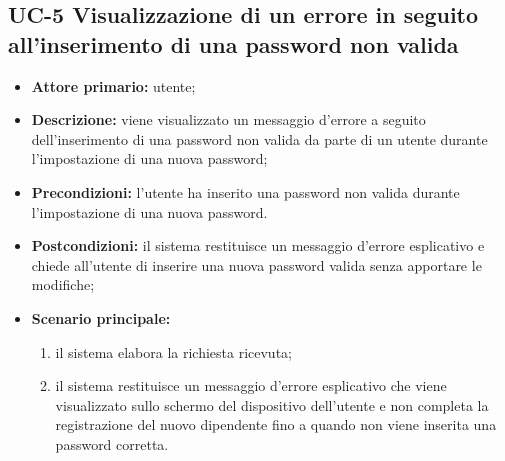 \subsection{UC-5 Visualizzazione di un errore in seguito all'inserimento di una password non valida}
\begin{itemize}
	\item \textbf{Attore primario:} utente;

	\item \textbf{Descrizione:} viene visualizzato un messaggio d'errore a seguito dell'inserimento di una password non valida da parte di un utente durante l'impostazione di una nuova password;

	\item \textbf{Precondizioni:} l'utente ha inserito una password non valida durante l'impostazione di una nuova password.

	\item \textbf{Postcondizioni:} il sistema restituisce un messaggio d'errore esplicativo e chiede all'utente di inserire una nuova password valida senza apportare le modifiche;

	\item \textbf{Scenario principale:}
	\begin{enumerate}
   		 \item il sistema elabora la richiesta ricevuta;
    	 \item il sistema restituisce un messaggio d'errore esplicativo che viene visualizzato sullo schermo del dispositivo dell'utente e non completa la registrazione del nuovo dipendente fino a quando non viene inserita una password corretta.
	\end{enumerate}
\end{itemize}
